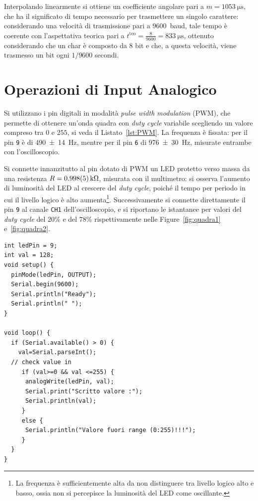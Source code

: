 \documentclass[10pt,oneside,a4paper]{article}
\begin{document}
\begin{multicols}{2}
Interpolando linearmente si ottiene un coefficiente angolare pari a $m = \SI{1053}{\micro\s}$, che ha il significato di tempo necessario per trasmettere un singolo carattere: considerando una velocità di trasmissione pari a \SI{9600}{baud}, tale tempo è coerente con l'aspettativa teorica pari a $t^\text{teo} = \frac{8}{9600} = \SI{833}{\micro\s}$, ottenuto considerando che un char è composto da $8$ bit e che, a questa velocità, viene trasmesso un bit ogni $1/9600$ secondi.

\section{Operazioni di Input Analogico}
Si utilizzano i pin digitali in modalità \emph{pulse width modulation} (PWM), che permette di ottenere un'onda quadra con \emph{duty cycle} variabile scegliendo un valore compreso tra $0$ e $255$, si veda il Listato~\ref{lst:PWM}. La frequenza è fissata: per il pin \texttt{9} è di \SI{490 \pm 14}{Hz}, mentre per il pin \texttt{6} di \SI{976 \pm 30}{Hz}, misurate entrambe con l'oscilloscopio. 

Si connette innanzitutto al pin dotato di PWM un LED protetto verso massa da una resistenza $R = \SI{0.998 \pm 0.005}{\kilo\ohm}$, misurata con il multimetro: si osserva l'aumento di luminosità del LED al crescere del \emph{duty cycle}, poiché il tempo per periodo in cui il livello logico è alto aumenta\footnote{La frequenza è sufficientemente alta da non distinguere tra livello logico alto e basso, ossia non si percepisce la luminosità del LED come oscillante.}. Successivamente si connette direttamente il pin \texttt{9} al canale \texttt{CH1} dell'oscilloscopio, e si riportano le istantanee per valori del \emph{duty cycle} del $20\%$ e del $78\%$ rispettivamente nelle Figure~\ref{fig:quadra1} e~\ref{fig:quadra2}. 

\begin{lstlisting}[style=CStyle, caption={Codice per la scrittura PWM}, label=lst:PWM]
int ledPin = 9;
int val = 128;
void setup() {
  pinMode(ledPin, OUTPUT);
  Serial.begin(9600);
  Serial.println("Ready");
  Serial.println(" ");
}

void loop() {
  if (Serial.available() > 0) {
    val=Serial.parseInt();
  // check value in
     if (val>=0 && val <=255) {
      analogWrite(ledPin, val);
      Serial.print("Scritto valore :");
      Serial.println(val);
     }
     else {
      Serial.println("Valore fuori range (0:255)!!!");
     }
  }
}
\end{lstlisting}


\end{multicols}
\end{document}
